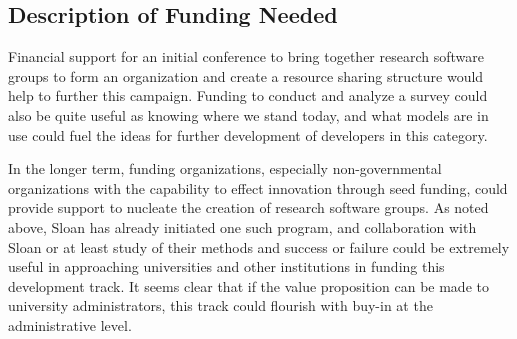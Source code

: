 \subsection{Description of Funding Needed}

Financial support for an initial conference to bring together research software
groups to form an organization and create a resource sharing structure would
help to further this campaign. Funding to conduct and analyze a survey could
also be quite useful as knowing where we stand today, and what models are in use
could fuel the ideas for further development of developers in this category.

In the longer term, funding organizations, especially non-governmental
organizations with the capability to effect innovation through seed funding,
could provide support to nucleate the creation of research software groups. As
noted above, Sloan has already initiated one such program, and collaboration
with Sloan or at least study of their methods and success or failure could be
extremely useful in approaching universities and other institutions in funding
this development track. It seems clear that if the value proposition can be made
to university administrators, this track could flourish with buy-in at the
administrative level.

